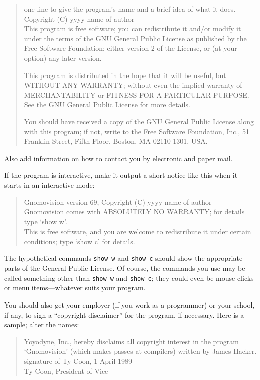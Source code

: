 	\begin{quote}
		one line to give the program's name and a brief idea of what it does. \\
		Copyright (C) yyyy  name of author \\
		
		This program is free software; you can redistribute it and/or modify
		it under the terms of the GNU General Public License as published by
		the Free Software Foundation; either version 2 of the License, or
		(at your option) any later version.
		
		This program is distributed in the hope that it will be useful,
		but WITHOUT ANY WARRANTY; without even the implied warranty of
		MERCHANTABILITY or FITNESS FOR A PARTICULAR PURPOSE.  See the
		GNU General Public License for more details.
		
		You should have received a copy of the GNU General Public License
		along with this program; if not, write to the Free Software
		Foundation, Inc., 51 Franklin Street, Fifth Floor, Boston, MA  02110-1301, USA.
	\end{quote}
	
	Also add information on how to contact you by electronic and paper mail.
	
	If the program is interactive, make it output a short notice like this
	when it starts in an interactive mode:
	
	\begin{quote}
		Gnomovision version 69, Copyright (C) yyyy  name of author \\
		Gnomovision comes with ABSOLUTELY NO WARRANTY; for details type `show w'. \\
		This is free software, and you are welcome to redistribute it
		under certain conditions; type `show c' for details.
	\end{quote}
	
	
	The hypothetical commands {\tt show w} and {\tt show c} should show the
	appropriate parts of the General Public License.  Of course, the commands
	you use may be called something other than {\tt show w} and {\tt show c};
	they could even be mouse-clicks or menu items---whatever suits your
	program.
	
	You should also get your employer (if you work as a programmer) or your
	school, if any, to sign a ``copyright disclaimer'' for the program, if
	necessary.  Here is a sample; alter the names:
	
	\begin{quote}
		Yoyodyne, Inc., hereby disclaims all copyright interest in the program \\
		`Gnomovision' (which makes passes at compilers) written by James Hacker. \\
		
		signature of Ty Coon, 1 April 1989 \\
		Ty Coon, President of Vice
	\end{quote}
	
